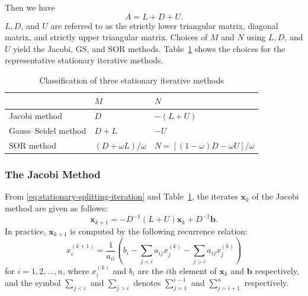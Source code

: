 {Then we have}
\[A=L+D+U.\]
{$L,D$, and $U$ are referred to as the strictly lower triangular matrix, diagonal matrix, and strictly upper triangular matrix.}
{Choices of $M$ and $N$ using $L,D$, and $U$ yield the Jacobi, GS, and SOR methods. Table~\ref{tab:stationary-splittings} shows the choices for the representative stationary iterative methods.}
\begin{table}[H]\centering
\caption{{Classification of three stationary iterative methods}}\label{tab:stationary-splittings}
\begin{tabular}{lll}\hline
& $M$ & $N$\\\hline
Jacobi {method} & $D$ & $-(L+U)$\\
Gauss--Seidel {method} & $D+L$ & $-U$\\
SOR {method} & $(D+\omega L)/\omega$ & $N=[(1-\omega)D-\omega U]/\omega$\\\hline
\end{tabular}\end{table}
\subsubsection{{The Jacobi Method}}\label{subsec:jacobi-method}
{From \eqref{eq:stationary-splitting-iteration} and Table~\ref{tab:stationary-splittings}, the iterates $\bm x_k$ of the Jacobi method are given as follows:}
\[\bm x_{k+1}=-D^{-1}(L+U)\bm x_k+D^{-1}\bm b.\]
{In practice, $\bm x_{k+1}$ is computed by the following recurrence relation:}
\begin{equation}\label{eq:jacobi-components}
x_i^{(k+1)}=\frac1{a_{ii}}\left(b_i-\sum_{j<i}a_{ij}x_j^{(k)}-\sum_{j>i}a_{ij}x_j^{(k)}\right)
\end{equation}
{for $i=1,2,\ldots,n$, where $x_i^{(k)}$ and $b_i$ are the $i$th element of $\bm x_k$ and $\bm b$ respectively, and the symbol $\sum_{j<i}$ and $\sum_{j>i}$ denotes $\sum_{j=1}^{i-1}$ and $\sum_{j=i+1}^n$ respectively.}

